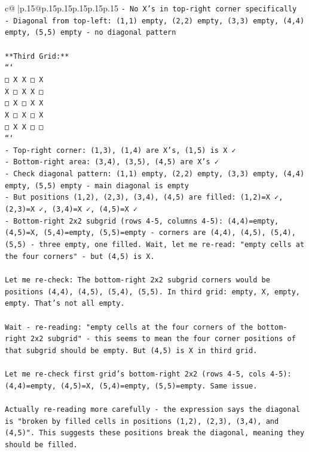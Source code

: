 \documentclass{article}
\begin{document}
{\begin{supertabular}{c@{$\;$}|p{.15\linewidth}@{}p{.15\linewidth}p{.15\linewidth}p{.15\linewidth}p{.15\linewidth}p{.15\linewidth}}
{{{\texttt{{-} No X's in top{-}right corner specifically} \\
\texttt{{-} Diagonal from top{-}left: (1,1) empty, (2,2) empty, (3,3) empty, (4,4) empty, (5,5) empty {-} no diagonal pattern} \\
\\ 
\texttt{**Third Grid:**} \\
\texttt{```} \\
\texttt{□ X X □ X} \\
\texttt{X □ X X □} \\
\texttt{□ X □ X X} \\
\texttt{X □ X □ X} \\
\texttt{□ X X □ □} \\
\texttt{```} \\
\texttt{{-} Top{-}right corner: (1,3), (1,4) are X's, (1,5) is X ✓} \\
\texttt{{-} Bottom{-}right area: (3,4), (3,5), (4,5) are X's ✓} \\
\texttt{{-} Check diagonal pattern: (1,1) empty, (2,2) empty, (3,3) empty, (4,4) empty, (5,5) empty {-} main diagonal is empty} \\
\texttt{{-} But positions (1,2), (2,3), (3,4), (4,5) are filled: (1,2)=X ✓, (2,3)=X ✓, (3,4)=X ✓, (4,5)=X ✓} \\
\texttt{{-} Bottom{-}right 2x2 subgrid (rows 4{-}5, columns 4{-}5): (4,4)=empty, (4,5)=X, (5,4)=empty, (5,5)=empty {-} corners are (4,4), (4,5), (5,4), (5,5) {-} three empty, one filled. Wait, let me re{-}read: "empty cells at the four corners" {-} but (4,5) is X.} \\
\\ 
\texttt{Let me re{-}check: The bottom{-}right 2x2 subgrid corners would be positions (4,4), (4,5), (5,4), (5,5). In third grid: empty, X, empty, empty. That's not all empty.} \\
\\ 
\texttt{Wait {-} re{-}reading: "empty cells at the four corners of the bottom{-}right 2x2 subgrid" {-} this seems to mean the four corner positions of that subgrid should be empty. But (4,5) is X in third grid.} \\
\\ 
\texttt{Let me re{-}check first grid's bottom{-}right 2x2 (rows 4{-}5, cols 4{-}5): (4,4)=empty, (4,5)=X, (5,4)=empty, (5,5)=empty. Same issue.} \\
\\ 
\texttt{Actually re{-}reading more carefully {-} the expression says the diagonal is "broken by filled cells in positions (1,2), (2,3), (3,4), and (4,5)". This suggests these positions break the diagonal, meaning they should be filled. } \\
}}}
\end{supertabular}}
\end{document}
